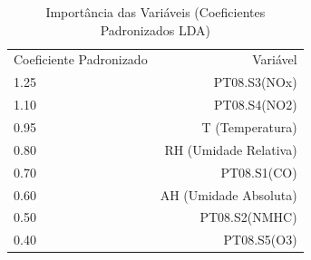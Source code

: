 \begin{table}[t]
  \centering
  \caption{Importância das Variáveis (Coeficientes Padronizados LDA)}
  \label{tab:importancia_variaveis}
\begin{tabular}{l r}
Coeficiente Padronizado & Variável \\
1.25 & PT08.S3(NOx) \\
1.10 & PT08.S4(NO2) \\
0.95 & T (Temperatura) \\
0.80 & RH (Umidade Relativa) \\
0.70 & PT08.S1(CO) \\
0.60 & AH (Umidade Absoluta) \\
0.50 & PT08.S2(NMHC) \\
0.40 & PT08.S5(O3) \\
\end{tabular}

\end{table}